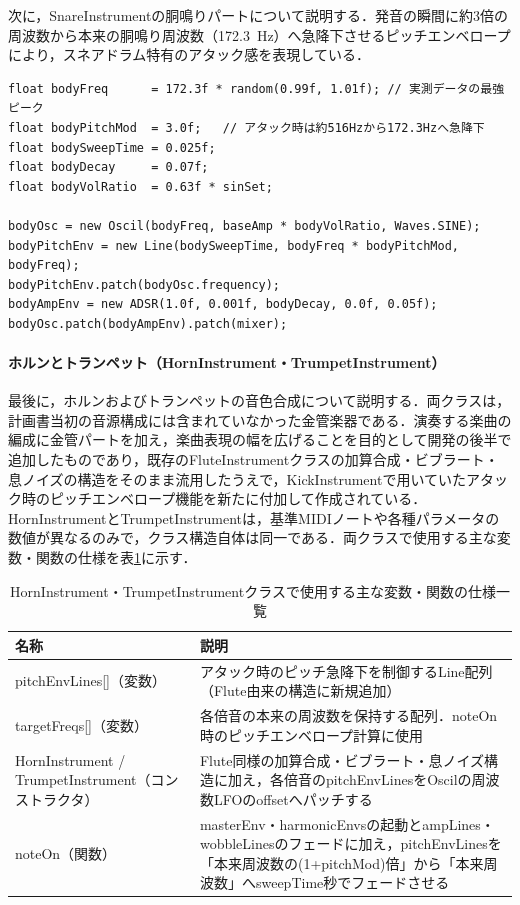 次に，SnareInstrumentの胴鳴りパートについて説明する．発音の瞬間に約3倍の周波数から本来の胴鳴り周波数（172.3~Hz）へ急降下させるピッチエンベロープにより，スネアドラム特有のアタック感を表現している．

\begin{lstlisting}[caption={SnareInstrumentコンストラクタ（胴鳴りパート）}, label={lst:gakki_snare}]
float bodyFreq      = 172.3f * random(0.99f, 1.01f); // 実測データの最強ピーク
float bodyPitchMod  = 3.0f;   // アタック時は約516Hzから172.3Hzへ急降下
float bodySweepTime = 0.025f;
float bodyDecay     = 0.07f;
float bodyVolRatio  = 0.63f * sinSet;

bodyOsc = new Oscil(bodyFreq, baseAmp * bodyVolRatio, Waves.SINE);
bodyPitchEnv = new Line(bodySweepTime, bodyFreq * bodyPitchMod, bodyFreq);
bodyPitchEnv.patch(bodyOsc.frequency);
bodyAmpEnv = new ADSR(1.0f, 0.001f, bodyDecay, 0.0f, 0.05f);
bodyOsc.patch(bodyAmpEnv).patch(mixer);
\end{lstlisting}

\paragraph{ホルンとトランペット（HornInstrument・TrumpetInstrument）}
最後に，ホルンおよびトランペットの音色合成について説明する．両クラスは，計画書当初の音源構成には含まれていなかった金管楽器である．演奏する楽曲の編成に金管パートを加え，楽曲表現の幅を広げることを目的として開発の後半で追加したものであり，既存のFluteInstrumentクラスの加算合成・ビブラート・息ノイズの構造をそのまま流用したうえで，KickInstrumentで用いていたアタック時のピッチエンベロープ機能を新たに付加して作成されている．HornInstrumentとTrumpetInstrumentは，基準MIDIノートや各種パラメータの数値が異なるのみで，クラス構造自体は同一である．両クラスで使用する主な変数・関数の仕様を表\ref{table:gakki_horn}に示す．

\begin{table}[H]
    \caption{HornInstrument・TrumpetInstrumentクラスで使用する主な変数・関数の仕様一覧}
    \centering
    \label{table:gakki_horn}
    \begin{tabular}{p{4.3cm}p{9.7cm}}
    \hline
    \textbf{名称} & \textbf{説明}\\
    \hline
    pitchEnvLines[]（変数） & アタック時のピッチ急降下を制御するLine配列（Flute由来の構造に新規追加）\\
    \hline
    targetFreqs[]（変数） & 各倍音の本来の周波数を保持する配列．noteOn時のピッチエンベロープ計算に使用\\
    \hline
    HornInstrument / TrumpetInstrument（コンストラクタ） & Flute同様の加算合成・ビブラート・息ノイズ構造に加え，各倍音のpitchEnvLinesをOscilの周波数LFOのoffsetへパッチする\\
    \hline
    noteOn（関数） & masterEnv・harmonicEnvsの起動とampLines・wobbleLinesのフェードに加え，pitchEnvLinesを「本来周波数の(1+pitchMod)倍」から「本来周波数」へsweepTime秒でフェードさせる\\
    \hline
    \end{tabular}
\end{table}

